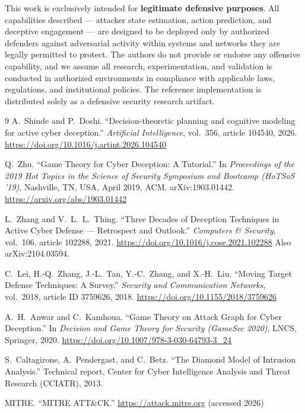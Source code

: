 \documentclass[11pt]{article}
\begin{document}
This work is exclusively intended for \textbf{legitimate defensive
purposes}. All capabilities described --- attacker state estimation, action
prediction, and deceptive engagement --- are designed to be deployed only by
authorized defenders against adversarial activity within systems and
networks they are legally permitted to protect. The authors do not provide
or endorse any offensive capability, and we assume all research,
experimentation, and validation is conducted in authorized environments in
compliance with applicable laws, regulations, and institutional policies.
The reference implementation is distributed solely as a defensive security
research artifact.

\small
\begin{thebibliography}{9}
A.~Shinde and P.~Doshi.
``Decision-theoretic planning and cognitive modeling for active cyber
deception.''
\textit{Artificial Intelligence}, vol.~356, article 104540, 2026.
\url{https://doi.org/10.1016/j.artint.2026.104540}

Q.~Zhu.
``Game Theory for Cyber Deception: A Tutorial.''
In \textit{Proceedings of the 2019 Hot Topics in the Science of Security
Symposium and Bootcamp (HoTSoS '19)}, Nashville, TN, USA, April 2019, ACM.
arXiv:1903.01442.
\url{https://arxiv.org/abs/1903.01442}

L.~Zhang and V.~L.~L.~Thing.
``Three Decades of Deception Techniques in Active Cyber Defense ---
Retrospect and Outlook.''
\textit{Computers \& Security}, vol.~106, article 102288, 2021.
\url{https://doi.org/10.1016/j.cose.2021.102288}
Also arXiv:2104.03594.

C.~Lei, H.-Q.~Zhang, J.-L.~Tan, Y.-C.~Zhang, and X.-H.~Liu.
``Moving Target Defense Techniques: A Survey.''
\textit{Security and Communication Networks}, vol.~2018, article ID
3759626, 2018.
\url{https://doi.org/10.1155/2018/3759626}

A.~H.~Anwar and C.~Kamhoua.
``Game Theory on Attack Graph for Cyber Deception.''
In \textit{Decision and Game Theory for Security (GameSec 2020)}, LNCS,
Springer, 2020.
\url{https://doi.org/10.1007/978-3-030-64793-3_24}

S.~Caltagirone, A.~Pendergast, and C.~Betz.
``The Diamond Model of Intrusion Analysis.''
Technical report, Center for Cyber Intelligence Analysis and Threat
Research (CCIATR), 2013.

MITRE.
``MITRE ATT\&CK.''
\url{https://attack.mitre.org} (accessed 2026)


\end{thebibliography}
\end{document}
